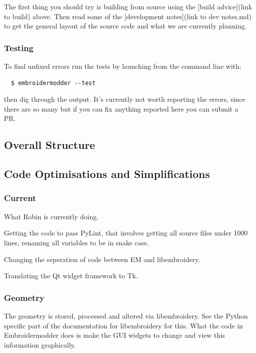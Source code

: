 \documentclass[a4paper, 11pt]{report}
\begin{document}
The first thing you should try is building from source using the [build advice](link to build)
above. Then read some of the [development notes](link to dev notes.md) to get the general
layout of the source code and what we are currently planning.

\subsubsection{Testing}

To find unfixed errors run the tests by launching from the command line with:

\begin{verbatim}
  $ embroidermodder --test
\end{verbatim}

then dig through the output. It's currently not worth reporting the errors, since
there are so many but if you can fix anything reported here you can submit a PR.

\subsection{Overall Structure}

\subsection{Code Optimisations and Simplifications}

\subsubsection{Current}

What Robin is currently doing.

Getting the code to pass PyLint, that involves getting all source files
under 1000 lines, renaming all variables to be in snake case.

Changing the seperation of code between EM and libembroidery.

Translating the Qt widget framework to Tk.

\subsubsection{Geometry}

The geometry is stored, processed and altered via libembroidery. See the Python specific part of the documentation for libembroidery for this. What the code in Embroidermodder does is make the GUI widgets to change and view this information graphically.
\end{document}
